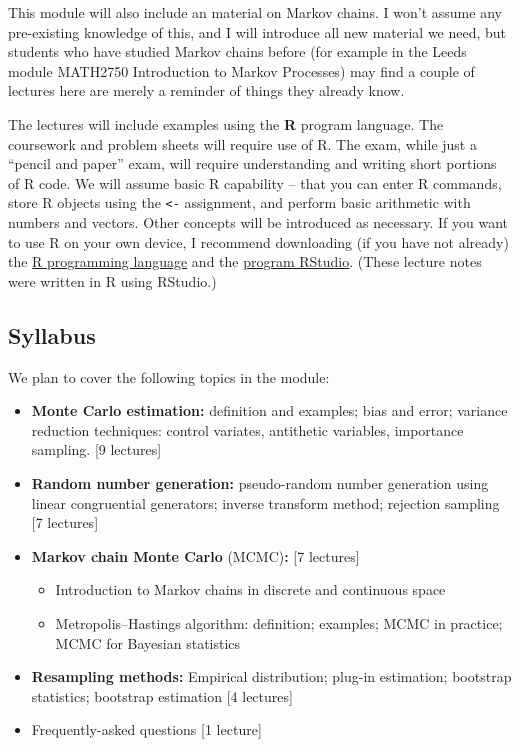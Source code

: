 \documentclass[
  letterpaper,
  DIV=11,
  numbers=noendperiod]{scrreprt}
\theoremstyle{plain}
\theoremstyle{definition}
\theoremstyle{definition}
\theoremstyle{remark}
\begin{document}
This module will also include an material on Markov chains. I won't
assume any pre-existing knowledge of this, and I will introduce all new
material we need, but students who have studied Markov chains before
(for example in the Leeds module MATH2750 Introduction to Markov
Processes) may find a couple of lectures here are merely a reminder of
things they already know.

The lectures will include examples using the \textbf{R} program
language. The coursework and problem sheets will require use of R. The
exam, while just a ``pencil and paper'' exam, will require understanding
and writing short portions of R code. We will assume basic R capability
-- that you can enter R commands, store R objects using the
\texttt{\textless{}-} assignment, and perform basic arithmetic with
numbers and vectors. Other concepts will be introduced as necessary. If
you want to use R on your own device, I recommend downloading (if you
have not already) the \href{https://cran.r-project.org}{R programming
language} and the \href{https://posit.co/downloads/}{program RStudio}.
(These lecture notes were written in R using RStudio.)

\subsection*{Syllabus}\label{syllabus}

We plan to cover the following topics in the module:

\begin{itemize}
\item
  \textbf{Monte Carlo estimation:} definition and examples; bias and
  error; variance reduction techniques: control variates, antithetic
  variables, importance sampling. {[}9 lectures{]}
\item
  \textbf{Random number generation:} pseudo-random number generation
  using linear congruential generators; inverse transform method;
  rejection sampling {[}7 lectures{]}
\item
  \textbf{Markov chain Monte Carlo} (MCMC)\textbf{:} {[}7 lectures{]}

  \begin{itemize}
  \item
    Introduction to Markov chains in discrete and continuous space
  \item
    Metropolis--Hastings algorithm: definition; examples; MCMC in
    practice; MCMC for Bayesian statistics
  \end{itemize}
\item
  \textbf{Resampling methods:} Empirical distribution; plug-in
  estimation; bootstrap statistics; bootstrap estimation {[}4
  lectures{]}
\item
  Frequently-asked questions {[}1 lecture{]}
\end{itemize}
\end{document}
